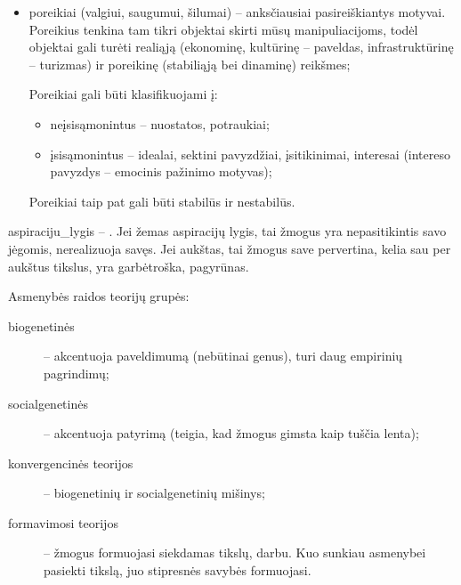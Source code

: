 \begin{itemize}
  \item poreikiai (valgiui, saugumui, šilumai) – anksčiausiai 
    pasireiškiantys motyvai. Poreikius tenkina tam tikri objektai skirti
    mūsų manipuliacijoms, todėl objektai gali turėti realiąją (ekonominę,
    kultūrinę – paveldas, infrastruktūrinę – turizmas) ir poreikinę 
    (stabiliąją bei dinaminę) reikšmes;

    Poreikiai gali būti klasifikuojami į:
    \begin{itemize}
      \item neįsisąmonintus – nuostatos, potraukiai;
      \item įsisąmonintus – idealai, sektini pavyzdžiai, įsitikinimai,
        interesai (intereso pavyzdys – emocinis pažinimo motyvas);
    \end{itemize}

    Poreikiai taip pat gali būti stabilūs ir nestabilūs.
\end{itemize}


\Gls{aspiraciju_lygis} – . Jei žemas 
aspiracijų lygis, tai žmogus yra nepasitikintis savo jėgomis, nerealizuoja
savęs. Jei aukštas, tai žmogus save pervertina, kelia sau per aukštus
tikslus, yra garbėtroška, pagyrūnas.

Asmenybės raidos teorijų grupės:

\begin{description}
  \item[biogenetinės] – akcentuoja paveldimumą (nebūtinai genus), turi
    daug empirinių pagrindimų;
  \item[socialgenetinės] – akcentuoja patyrimą (teigia, kad žmogus gimsta
    kaip tuščia lenta);
  \item[konvergencinės teorijos] – biogenetinių ir socialgenetinių mišinys;
  \item[formavimosi teorijos]  – žmogus formuojasi siekdamas tikslų, darbu.
    Kuo sunkiau asmenybei pasiekti tikslą, juo stipresnės savybės 
    formuojasi.
\end{description}


